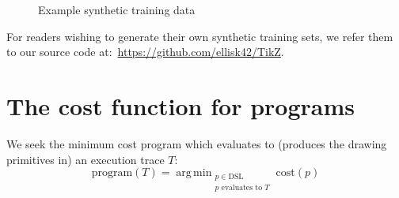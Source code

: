 \documentclass{article}
\DeclareMathOperator*{\argmin}{arg\,min} %
\DeclareMathOperator{\argmin}{argmin} %
\begin{document}
\begin{figure}
      \begin{minipage}[t]{2.2cm}\end{minipage}
      \begin{minipage}[t]{2.2cm}\end{minipage}
      \begin{minipage}[t]{2.2cm}\end{minipage}
      \begin{minipage}[t]{2.2cm}\end{minipage}
      \caption{Example synthetic training data}\label{exampleTrainingData}
\end{figure}

For readers wishing to generate their own synthetic training sets,
we refer them to our source code at:~\url{https://github.com/ellisk42/TikZ}.

\section{The cost function for programs}

We seek the minimum cost program which evaluates to (produces the drawing primitives in) an execution trace $T$:
\begin{equation}
  \text{program}(T) = \argmin_{\substack{p\in \text{DSL}\\p \text{ evaluates to } T}} \text{cost}(p)\label{programObjective}
\end{equation}
\end{document}
